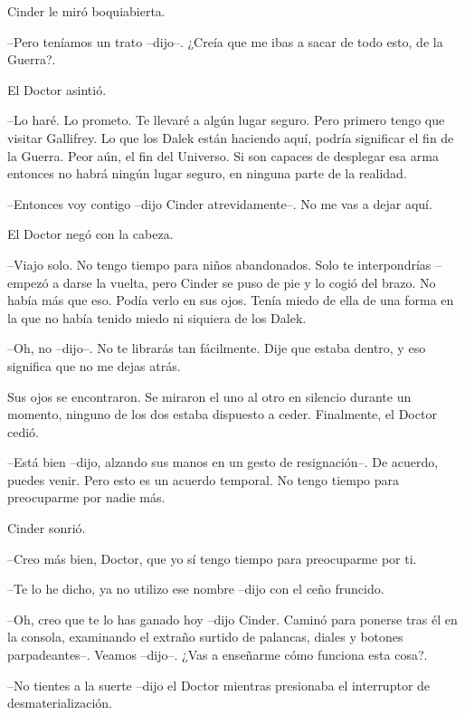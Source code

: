 Cinder le miró boquiabierta. 

--Pero teníamos un trato --dijo--. ¿Creía que me ibas a sacar de todo esto, de la Guerra?.
 
El Doctor asintió. 

--Lo haré. Lo prometo. Te llevaré a algún lugar seguro. Pero primero tengo que visitar Gallifrey. Lo que los Dalek están haciendo aquí, podría significar el fin de la Guerra. Peor aún, el fin del Universo. Si son capaces de desplegar esa arma entonces no habrá ningún lugar seguro, en ninguna parte de la realidad.

--Entonces voy contigo --dijo Cinder atrevidamente--. No me vas a dejar aquí. 

El Doctor negó con la cabeza. 

--Viajo solo. No tengo tiempo para niños abandonados. Solo te interpondrías --empezó a darse la vuelta, pero Cinder se puso de pie y lo cogió del brazo. No había más que eso. Podía verlo en sus ojos. Tenía miedo de ella de una forma en la que no había tenido miedo ni siquiera de los Dalek. 

--Oh, no --dijo--. No te librarás tan fácilmente. Dije que estaba dentro, y eso significa que no me dejas atrás.

Sus ojos se encontraron. Se miraron el uno al otro en silencio durante un momento, ninguno de los dos estaba dispuesto a ceder. Finalmente, el Doctor cedió. 

--Está bien --dijo, alzando sus manos en un gesto de resignación--. De acuerdo, puedes venir. Pero esto es un acuerdo temporal. No tengo tiempo para preocuparme por nadie más. 

Cinder sonrió. 

--Creo más bien, Doctor, que yo sí tengo tiempo para preocuparme por ti.

--Te lo he dicho, ya no utilizo ese nombre --dijo con el ceño fruncido.

--Oh, creo que te lo has ganado hoy --dijo Cinder. Caminó para ponerse tras él en la consola, examinando el extraño surtido de palancas, diales y botones parpadeantes--. Veamos --dijo--. ¿Vas a enseñarme cómo funciona esta cosa?.
 
--No tientes a la suerte --dijo el Doctor mientras presionaba el interruptor de desmaterialización.

